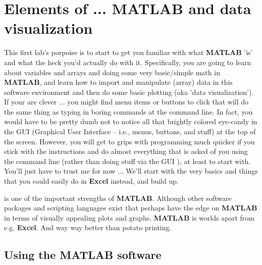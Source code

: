 \documentclass{tufte-book} %
\begin{document}
\chapter{Elements of ... MATLAB and data visualization}
\label{ch:01}


\begin{fullwidth}

 This first lab's porpoise is to start to get you familiar with what \textbf{MATLAB} 'is' and what the heck you'd actually do with it. Specifically, you are going to learn about variables and arrays and  doing some very basic/simple math in \textbf{MATLAB}, and learn how to import and manipulate (array) data in this software environment and then do some basic plotting (aka 'data visualization'). If your are clever ... you might find menu items or buttons to click that will do the same thing as typing in boring commands at the command line. In fact, you would have to be pretty dumb not to notice all that brightly colored eye-candy in the GUI (Graphical User Interface -- i.e., menus, buttons, and stuff) at the top of  the screen. However, you will get to grips with programming much quicker if you stick with the instructions and do almost everything that is asked of you using the command line  (rather than doing stuff via the GUI ), at least to start with. You'll just have to trust me for now ... We'll start with the very basics and things that you could easily do in \textbf{Excel} instead, and build up.

 is one of the important strengths of \textbf{MATLAB}. Although other software packages and scripting languages exist that perhaps have the edge on \textbf{MATLAB} in terms of visually appealing plots and graphs, \textbf{MATLAB} is worlds apart from e.g. \textbf{Excel}. And way way better than potato printing.

\end{fullwidth}


\newpage


\section{Using the MATLAB software}

\end{document}
